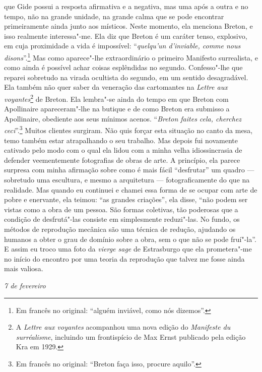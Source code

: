 que Gide possui a resposta afirmativa e a negativa, mas uma após a outra
e no tempo, não na grande unidade, na grande calma que se pode encontrar
primeiramente ainda junto aos místicos. Neste momento, ela menciona
Breton, e isso realmente interessa"-me. Ela diz que Breton é um caráter
tenso, explosivo, em cuja proximidade a vida é impossível:
``\emph{quelqu'un d'inviable, comme nous disons}''.\footnote{Em francês no original: ``alguém inviável, como nós dizemos''. \versal{[N.~T.]}} Mas como
aparece"-lhe extraordinário o primeiro Manifesto surrealista, e como
ainda é possível achar coisas esplêndidas no segundo. Confesso"-lhe que
reparei sobretudo na virada ocultista do segundo, em um sentido
desagradável. Ela também não quer saber da veneração das cartomantes na
\emph{Lettre aux voyantes}\footnote{A \emph{Lettre aux voyantes}
  acompanhou uma nova edição do \emph{Manifeste du surréalisme},
  incluindo um frontispício de Max Ernst publicado pela edição Kra em
  1929. \versal{[N.~O.]}} de Breton. Ela lembra"-se ainda do tempo em que Breton com
Apollinaire apareceram"-lhe na butique e de como Breton era submisso a
Apollinaire, obediente aos seus mínimos acenos. ``\emph{Breton faites
cela, cherchez ceci}''.\footnote{Em francês no original: ``Breton faça isso, procure
  aquilo''. \versal{[N.~T.]}} Muitos clientes surgiram. Não quis
forçar esta situação no canto da mesa, temo também estar atrapalhando
o seu trabalho. Mas depois fui novamente cativado pelo modo com o qual
ela lidou com a minha velha idiossincrasia de defender veementemente fotografias de obras de arte. A princípio, ela parece surpresa com minha
afirmação sobre como é mais fácil ``desfrutar'' um quadro --- sobretudo uma
escultura, e mesmo a arquitetura --- fotograficamente do que na
realidade. Mas quando eu continuei e chamei essa forma de se ocupar com
arte de pobre e enervante, ela teimou: ``as grandes criações'', ela disse,
``não podem ser vistas como a obra de um pessoa. São formas coletivas,
tão poderosas que a condição de desfrutá"-las consiste em simplesmente
reduzi"-las. No fundo, os métodos de reprodução mecânica são uma técnica
de redução, ajudando os humanos a obter o grau de domínio sobre a obra,
sem o que não se pode fruí"-la''. E assim eu troco uma foto da
\emph{vierge sage} de Estrasburgo que ela prometera"-me no início do
encontro por uma teoria da reprodução que talvez me fosse ainda mais
valiosa.


\begin{flushright}
\emph{7 de fevereiro}
\end{flushright}

